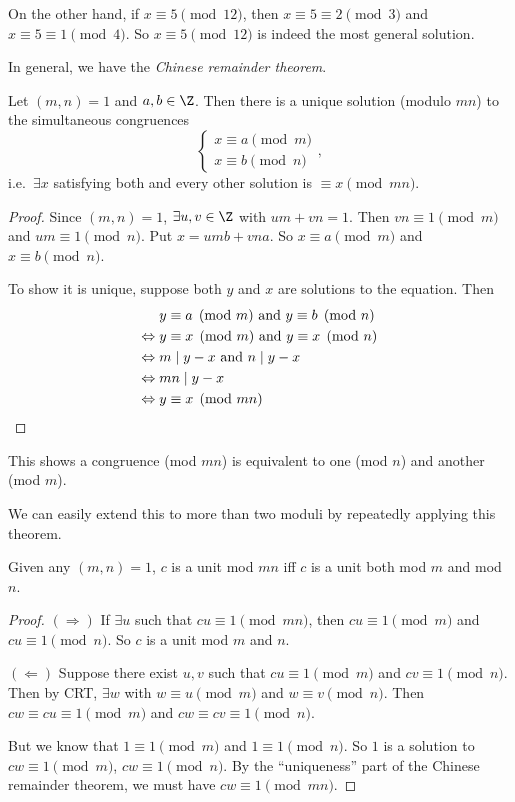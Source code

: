 \documentclass[a4paper]{article}
\begin{document}
On the other hand, if $x\equiv 5\pmod {12}$, then $x\equiv 5\equiv 2 \pmod 3$ and $x\equiv 5\equiv 1\pmod 4$. So $x\equiv 5\pmod {12}$ is indeed the most general solution.

In general, we have the \emph{Chinese remainder theorem}.
\begin{thm}
  Let $(m, n) = 1$ and $a, b\in \Z$. Then there is a unique solution (modulo $mn$) to the simultaneous congruences
  \[
    \begin{cases}x\equiv a\pmod m \\ x\equiv b\pmod n \end{cases},
  \]
  i.e.\ $\exists x$ satisfying both and every other solution is $\equiv x \pmod {mn}$.
\end{thm}

\begin{proof}
  Since $(m, n) = 1$, $\exists u, v\in \Z$ with $um + vn = 1$. Then $vn \equiv 1\pmod m$ and $um \equiv 1 \pmod n$. Put $x = umb + vna$. So $x\equiv a\pmod m$ and $x\equiv b\pmod n$.

  To show it is unique, suppose both $y$ and $x$ are solutions to the equation. Then
  \begin{align*}
    &\; y \equiv a\pmod m \text{ and } y \equiv b\pmod n\\
    \Leftrightarrow &\; y \equiv x\pmod m \text{ and } y\equiv x\pmod n\\
    \Leftrightarrow &\; m \mid y - x\text{ and } n \mid y - x\\
    \Leftrightarrow &\; mn \mid y - x\\
    \Leftrightarrow &\; y \equiv x\pmod {mn}\qedhere
  \end{align*}
\end{proof}
This shows a congruence (mod $mn$) is equivalent to one (mod $n$) and another (mod $m$).

We can easily extend this to more than two moduli by repeatedly applying this theorem.

\begin{prop}
  Given any $(m,n) = 1$, $c$ is a unit mod $mn$ iff $c$ is a unit both mod $m$ and mod $n$.
\end{prop}

\begin{proof}
  $(\Rightarrow)$ If $\exists u$ such that $cu \equiv 1 \pmod {mn}$, then $cu \equiv 1\pmod m$ and $cu\equiv 1\pmod n$. So $c$ is a unit mod $m$ and $n$.

  $(\Leftarrow)$ Suppose there exist $u, v$ such that $cu\equiv 1\pmod m$ and $cv \equiv 1\pmod n$. Then by CRT, $\exists w$ with $w\equiv u \pmod m$ and $w\equiv v\pmod n$. Then $cw\equiv cu\equiv 1\pmod m$ and $cw\equiv cv\equiv 1\pmod n$.

  But we know that $1\equiv 1\pmod m$ and $1\equiv 1\pmod n$. So $1$ is a solution to $cw \equiv 1\pmod m$, $cw\equiv 1\pmod n$. By the ``uniqueness'' part of the Chinese remainder theorem, we must have $cw\equiv 1\pmod {mn}$.
\end{proof}
\end{document}
